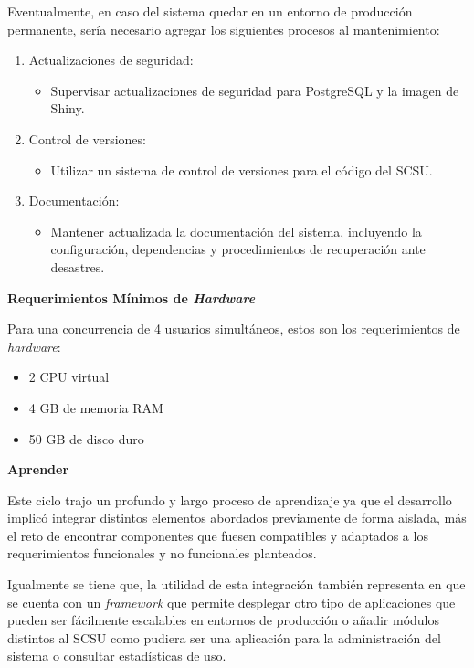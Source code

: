 \documentclass[
  12pt,
  openany]{book}
\providecommand{\tightlist}{%
  \setlength{\itemsep}{0pt}\setlength{\parskip}{0pt}}
\begin{document}
Eventualmente, en caso del sistema quedar en un entorno de producción permanente, sería necesario agregar los siguientes procesos al mantenimiento:

\begin{enumerate}
\def\labelenumi{\arabic{enumi}.}
\item
  Actualizaciones de seguridad:

  \begin{itemize}
  \tightlist
  \item
    Supervisar actualizaciones de seguridad para PostgreSQL y la imagen de Shiny.
  \end{itemize}
\item
  Control de versiones:

  \begin{itemize}
  \tightlist
  \item
    Utilizar un sistema de control de versiones para el código del SCSU.
  \end{itemize}
\item
  Documentación:

  \begin{itemize}
  \tightlist
  \item
    Mantener actualizada la documentación del sistema, incluyendo la configuración, dependencias y procedimientos de recuperación ante desastres.
  \end{itemize}
\end{enumerate}

\textbf{Requerimientos Mínimos de \emph{Hardware}}

Para una concurrencia de 4 usuarios simultáneos, estos son los requerimientos de \emph{hardware}:

\begin{itemize}
\tightlist
\item
  2 CPU virtual
\item
  4 GB de memoria RAM
\item
  50 GB de disco duro
\end{itemize}

\textbf{Aprender}

Este ciclo trajo un profundo y largo proceso de aprendizaje ya que el desarrollo implicó integrar distintos elementos abordados previamente de forma aislada, más el reto de encontrar componentes que fuesen compatibles y adaptados a los requerimientos funcionales y no funcionales planteados.

Igualmente se tiene que, la utilidad de esta integración también representa en que se cuenta con un \emph{framework} que permite desplegar otro tipo de aplicaciones que pueden ser fácilmente escalables en entornos de producción o añadir módulos distintos al SCSU como pudiera ser una aplicación para la administración del sistema o consultar estadísticas de uso.
\end{document}
